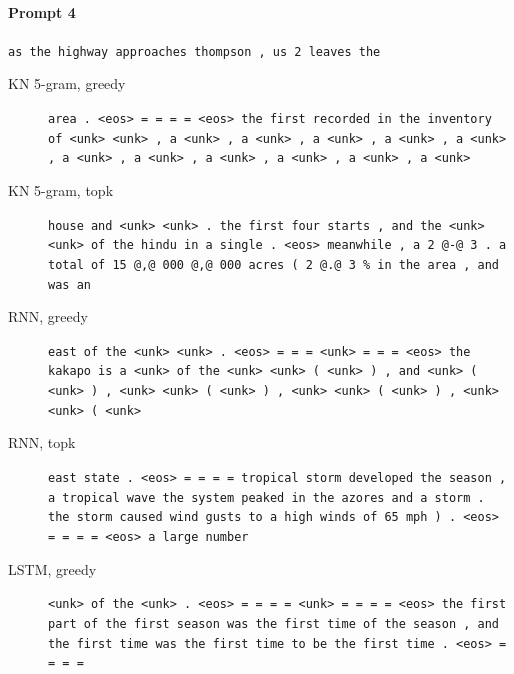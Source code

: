 \paragraph{Prompt 4} \texttt{as the highway approaches thompson , us 2 leaves the}
\begin{description}
\item[KN 5-gram, greedy] \texttt{\small area . \textless{}eos\textgreater{} = = = = \textless{}eos\textgreater{} the first recorded in the inventory of \textless{}unk\textgreater{} \textless{}unk\textgreater{} , a \textless{}unk\textgreater{} , a \textless{}unk\textgreater{} , a \textless{}unk\textgreater{} , a \textless{}unk\textgreater{} , a \textless{}unk\textgreater{} , a \textless{}unk\textgreater{} , a \textless{}unk\textgreater{} , a \textless{}unk\textgreater{} , a \textless{}unk\textgreater{} , a \textless{}unk\textgreater{} , a \textless{}unk\textgreater{}}
\item[KN 5-gram, topk] \texttt{\small house and \textless{}unk\textgreater{} \textless{}unk\textgreater{} . the first four starts , and the \textless{}unk\textgreater{} \textless{}unk\textgreater{} of the hindu in a single . \textless{}eos\textgreater{} meanwhile , a 2 @-@ 3 . a total of 15 @,@ 000 @,@ 000 acres ( 2 @.@ 3 \% in the area , and was an}
\item[RNN, greedy] \texttt{\small east of the \textless{}unk\textgreater{} \textless{}unk\textgreater{} . \textless{}eos\textgreater{} = = = \textless{}unk\textgreater{} = = = \textless{}eos\textgreater{} the kakapo is a \textless{}unk\textgreater{} of the \textless{}unk\textgreater{} \textless{}unk\textgreater{} ( \textless{}unk\textgreater{} ) , and \textless{}unk\textgreater{} ( \textless{}unk\textgreater{} ) , \textless{}unk\textgreater{} \textless{}unk\textgreater{} ( \textless{}unk\textgreater{} ) , \textless{}unk\textgreater{} \textless{}unk\textgreater{} ( \textless{}unk\textgreater{} ) , \textless{}unk\textgreater{} \textless{}unk\textgreater{} ( \textless{}unk\textgreater{}}
\item[RNN, topk] \texttt{\small east state . \textless{}eos\textgreater{} = = = = tropical storm developed the season , a tropical wave the system peaked in the azores and a storm . the storm caused wind gusts to a high winds of 65 mph ) . \textless{}eos\textgreater{} = = = = \textless{}eos\textgreater{} a large number}
\item[LSTM, greedy] \texttt{\small \textless{}unk\textgreater{} of the \textless{}unk\textgreater{} . \textless{}eos\textgreater{} = = = = \textless{}unk\textgreater{} = = = = \textless{}eos\textgreater{} the first part of the first season was the first time of the season , and the first time was the first time to be the first time . \textless{}eos\textgreater{} = = = =}

\end{description}
